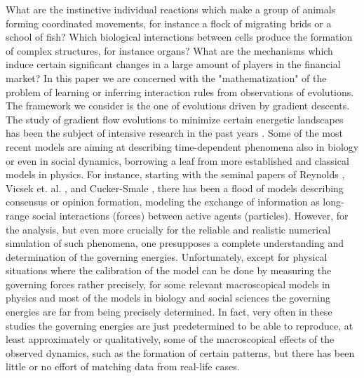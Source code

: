 \documentclass[A4paper,11pt]{article}
\theoremstyle{definition}
\begin{document}
What are the instinctive individual reactions which make a group of animals forming coordinated movements, for instance a flock of migrating brids or a school of fish? Which biological interactions between cells produce the formation of complex structures, for instance organs? What are the mechanisms which induce certain significant changes in a large amount of players in the financial market? 
In this paper we are concerned with the "mathematization" of the problem of learning or inferring interaction rules from observations of evolutions. The framework we consider is the one of  evolutions driven by gradient descents.
The study of gradient flow evolutions to minimize  certain energetic landscapes has been the subject of intensive research in the past years \cite{AGS}. Some of the most recent models are  aiming at describing time-dependent phenomena also in biology or even in social dynamics, borrowing a leaf from more established and classical  models in physics. For instance, starting with the seminal papers of Reynolds \cite{}, Vicsek et. al. \cite{}, and Cucker-Smale \cite{}, there has been a flood of models describing consensus or opinion formation,  modeling the exchange of information as long-range social interactions (forces) between active agents (particles). However, for the analysis, but even more crucially for the reliable and realistic numerical simulation of such phenomena, one presupposes a complete understanding and determination of the governing energies. Unfortunately, except for physical situations where the calibration of the model can be done by measuring the governing forces rather precisely, for some relevant macroscopical models in physics and most of the models in biology and social sciences the governing energies are far from being precisely determined. In fact, very often in these studies the governing energies are just predetermined to be able to reproduce, at least approximately or qualitatively, some of the macroscopical effects of the observed dynamics, such as the formation of certain patterns, but there has been little or no effort of matching data from real-life cases. 
\end{document}

